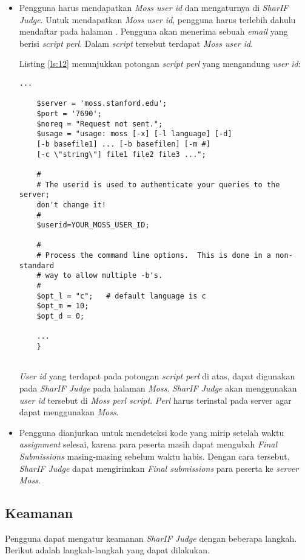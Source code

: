 \begin{itemize}
	\item Pengguna harus mendapatkan \textit{Moss user id} dan mengaturnya di \textit{SharIF Judge}. Untuk mendapatkan \textit{Moss user id}, pengguna harus terlebih dahulu mendaftar pada halaman . Pengguna akan menerima sebuah \textit{email} yang berisi \textit{script perl}. Dalam \textit{script} tersebut terdapat \textit{Moss user id}.
	
	Listing \ref{ls:12} menunjukkan potongan \textit{script perl} yang mengandung \textit{user id}:
	\begin{lstlisting}[basicstyle=\ttfamily, frame=single,
	columns=fullflexible, keepspaces=true, breaklines=true, label=ls:12, caption=Potongan \textit{script perl}]
	...
	
	$server = 'moss.stanford.edu';
	$port = '7690';
	$noreq = "Request not sent.";
	$usage = "usage: moss [-x] [-l language] [-d] 
	[-b basefile1] ... [-b basefilen] [-m #] 
	[-c \"string\"] file1 file2 file3 ...";
	
	#
	# The userid is used to authenticate your queries to the server; 
	don't change it!
	#
	$userid=YOUR_MOSS_USER_ID;
	
	#
	# Process the command line options.  This is done in a non-standard
	# way to allow multiple -b's.
	#
	$opt_l = "c";   # default language is c
	$opt_m = 10;
	$opt_d = 0;
	
	...
	}
	
	\end{lstlisting}
	
	\textit{User id} yang terdapat pada potongan \textit{script perl} di atas, dapat digunakan pada \textit{SharIF Judge} pada halaman \textit{Moss}. \textit{SharIF Judge} akan menggunakan \textit{user id} tersebut di \textit{Moss perl script}. \textit{Perl} harus terinstal pada server agar dapat menggunakan \textit{Moss}.  
	
	\item Pengguna dianjurkan untuk mendeteksi kode yang mirip setelah waktu \textit{assignment} selesai, karena para peserta masih dapat mengubah \textit{Final Submissions} masing-masing sebelum waktu habis. Dengan cara tersebut, \textit{SharIF Judge} dapat mengirimkan \textit{Final submissions} para peserta ke \textit{server Moss}.
\end{itemize}

\subsection{Keamanan}
\label{subsec:keamanan}
Pengguna dapat mengatur keamanan \textit{SharIF Judge} dengan beberapa langkah. Berikut adalah langkah-langkah yang dapat dilakukan.

